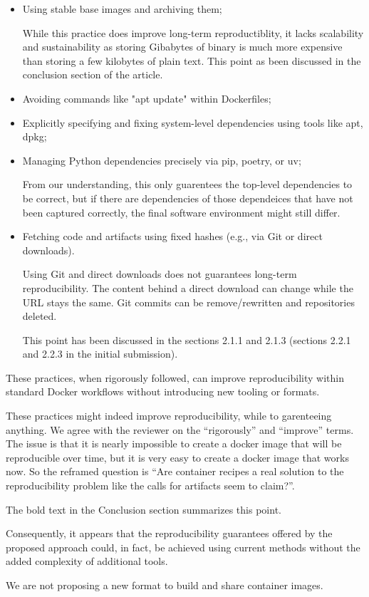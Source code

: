 \documentclass[%
	11pt,
	final,
]{article}
\begin{document}
\begin{itemize}
\item Using stable base images and archiving them;
  \begin{review-answer}
    While this practice does improve long-term reproductiblity, it lacks scalability and sustainability as storing Gibabytes of binary is much more expensive than storing a few kilobytes of plain text.
    This point as been discussed in the conclusion section of the article.
  \end{review-answer}
\item Avoiding commands like "apt update" within Dockerfiles;
\item Explicitly specifying and fixing system-level dependencies using tools like apt, dpkg;
\item Managing Python dependencies precisely via pip, poetry, or uv;
  \begin{review-answer}
    From our understanding, this only guarentees the top-level dependencies to be correct, but if there are dependencies of those dependeices that have not been captured correctly, the final software environment might still differ.
  \end{review-answer}
\item Fetching code and artifacts using fixed hashes (e.g., via Git or direct downloads).
  \begin{review-answer}
    Using Git and direct downloads does not guarantees long-term reproducibility.
    The content behind a direct download can change while the URL stays the same.
    Git commits can be remove/rewritten and repositories deleted.

    This point has been discussed in the sections 2.1.1 and 2.1.3 (sections 2.2.1 and 2.2.3 in the initial submission).
  \end{review-answer}
\end{itemize}

These practices, when rigorously followed, can improve reproducibility within standard Docker workflows without introducing new tooling or formats.
\begin{review-answer}
  These practices might indeed improve reproducibility, while to garenteeing anything.
  We agree with the reviewer on the ``rigorously'' and ``improve'' terms.
  The issue is that it is nearly impossible to create a docker image that will be reproducible over time, but it is very easy to create a docker image that works now.
  So the reframed question is ``Are container recipes a real solution to the reproducibility problem like the calls for artifacts seem to claim?''.

  The bold text in the Conclusion section summarizes this point.
\end{review-answer}
Consequently, it appears that the reproducibility guarantees offered by the proposed approach could, in fact, be achieved using current methods without the added complexity of additional tools.
\begin{review-answer}
  We are not proposing a new format to build and share container images.
\end{review-answer}
\end{document}
